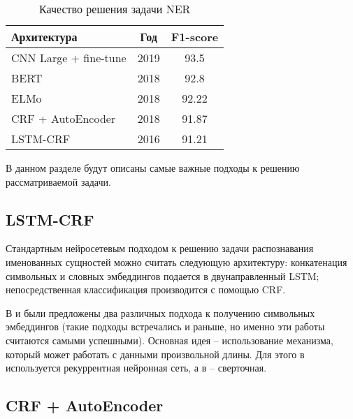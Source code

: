 \documentclass[a4paper,14pt]{extarticle}
\begin{document}
\begin{table}[H]
    \caption{Качество решения задачи NER}
    \label{progress}
    \begin{center}
    \begin{tabular}{l|c|c}
        Архитектура           & Год  & F1-score \\
        \hline
        CNN Large + fine-tune & 2019 & 93.5     \\
        BERT                  & 2018 & 92.8     \\
        ELMo                  & 2018 & 92.22    \\
        CRF + AutoEncoder     & 2018 & 91.87    \\
        LSTM-CRF              & 2016 & 91.21    \\
    \end{tabular}
    \end{center}
\end{table}

В данном разделе будут описаны самые важные подходы к решению рассматриваемой задачи.

\subsection{LSTM-CRF}

Стандартным нейросетевым подходом к решению задачи распознавания именованных сущностей можно считать следующую архитектуру: конкатенация символьных и словных эмбеддингов подается в двунаправленный LSTM; непосредственная классификация производится с помощью CRF.

В \cite{1603.01360} и \cite{1603.01354} были предложены два различных подхода к получению символьных эмбеддингов (такие подходы встречались и раньше, но именно эти работы считаются самыми успешными). Основная идея -- использование механизма, который может работать с данными произвольной длины. Для этого в \cite{1603.01360} используется рекуррентная нейронная сеть, а в \cite{1603.01354} -- сверточная.



\clearpage

\subsection{CRF + AutoEncoder}
\end{document}
